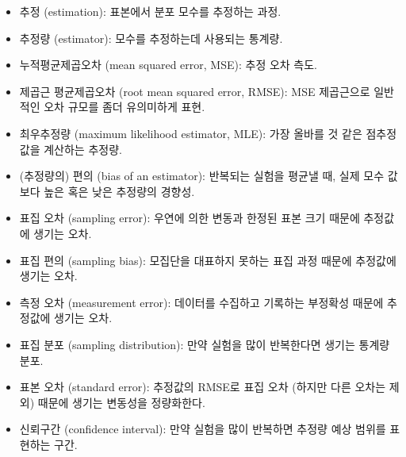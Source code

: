 \begin{itemize}

\item 추정 (estimation): 표본에서 분포 모수를 추정하는 과정.

\item 추정량 (estimator): 모수를 추정하는데 사용되는 통계량.

\item 누적평균제곱오차 (mean squared error, MSE): 추정 오차 측도.

\item 제곱근 평균제곱오차 (root mean squared error, RMSE): 
MSE 제곱근으로 일반적인 오차 규모를 좀더 유의미하게 표현.

\item 최우추정량 (maximum likelihood estimator, MLE): 가장 올바를 것 같은 점추정값을 계산하는 추정량.

\item (추정량의) 편의 (bias of an estimator): 반복되는 실험을 평균낼 때, 실제 모수 값보다 높은 혹은 낮은 추정량의 경향성. 

\item 표집 오차 (sampling error): 
우연에 의한 변동과 한정된 표본 크기 때문에 추정값에 생기는 오차.

\item 표집 편의 (sampling bias): 
모집단을 대표하지 못하는 표집 과정 때문에 추정값에 생기는 오차.

\item 측정 오차 (measurement error): 
데이터를 수집하고 기록하는 부정확성 때문에 추정값에 생기는 오차.

\item 표집 분포 (sampling distribution): 
만약 실험을 많이 반복한다면 생기는 통계량 분포.

\item 표본 오차 (standard error): 
추정값의 RMSE로 표집 오차 (하지만 다른 오차는 제외) 때문에 생기는 변동성을 정량화한다.

\item 신뢰구간 (confidence interval): 
만약 실험을 많이 반복하면 추정량 예상 범위를 표현하는 구간.

\end{itemize}
